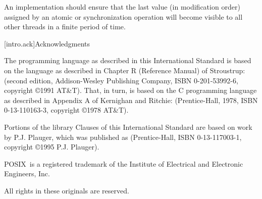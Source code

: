 \pnum
An implementation should ensure that the last value (in modification order)
assigned by an atomic or synchronization operation will become visible to all
other threads in a finite period of time.%
%

[intro.ack]{Acknowledgments}

\pnum
The \Cpp  programming language as described in this International
Standard is based on the language as described in Chapter R (Reference
Manual) of Stroustrup:  (second
edition, Addison-Wesley Publishing Company, ISBN 0-201-53992-6,
copyright \copyright 1991 AT\&T). That, in turn, is based on the C
programming language as described in Appendix A of Kernighan and
Ritchie:  (Prentice-Hall, 1978, ISBN
0-13-110163-3, copyright \copyright 1978 AT\&T).

\pnum
Portions of the library Clauses of this International Standard are based
on work by P.J. Plauger, which was published as  (Prentice-Hall, ISBN 0-13-117003-1, copyright
\copyright 1995 P.J. Plauger).

\pnum
POSIX\textregistered\ is a registered trademark of the Institute of Electrical and
Electronic Engineers, Inc.

\pnum
All rights in these originals are reserved.
